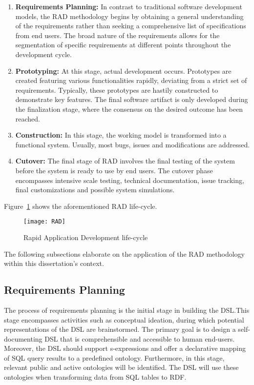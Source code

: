 \begin{enumerate}
\item \textbf{Requirements Planning:} In contrast to traditional software development models, the RAD methodology begins by obtaining a general understanding of the requirements rather than seeking a comprehensive list of specifications from end users.  The broad nature of the requirements allows for the segmentation of specific requirements at different points throughout the development cycle.

\item \textbf{Prototyping:} At this stage, actual development occurs.  Prototypes are created featuring various functionalities rapidly, deviating from a strict set of requirements.  Typically, these prototypes are hastily constructed to demonstrate key features.  The final software artifact is only developed during the finalization stage, where the consensus on the desired outcome has been reached.

\item \textbf{Construction:}  In this stage, the working model is transformed into a functional system.  Usually, most bugs, issues and modifications are addressed.

\item \textbf{Cutover:} The final stage of RAD involves the final testing of the system before the system is ready to use by end users.  The cutover phase encompasses intensive scale testing, technical documentation, issue tracking, final customizations and possible system simulations.
\end{enumerate}

Figure~\ref{fig:rad-lifecycle} shows the aforementioned RAD life-cycle.

\begin{figure}[H]
  \centering
  \texttt{[image: RAD]}
  \caption{Rapid Application Development life-cycle}
  \label{fig:rad-lifecycle}
\end{figure}

The following subsections elaborate on the application of the RAD methodology within this dissertation's context.

\subsection{Requirements Planning}

The process of requirements planning is the initial stage in building the DSL.\@  This stage encompasses activities such as conceptual ideation, during which potential representations of the DSL are brainstormed.  The primary goal is to design a self-documenting DSL that is comprehensible and accessible to human end-users.  Moreover, the DSL should support s-expressions and offer a declarative mapping of SQL query results to a predefined ontology.  Furthermore, in this stage, relevant public and active ontologies will be identified.  The DSL will use these ontologies when transforming data from SQL tables to RDF\@.

